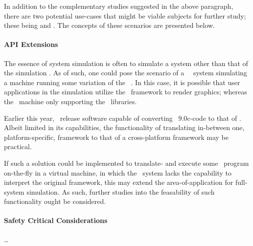\noindent
In addition to the complementary studies suggested in the above paragraph, there are two potential use-cases that might be viable subjects for further study; these being  and .
The concepts of these scenarios are presented below.

\paragraph{API Extensions}
\label{par:futurework_apiextensions}
The essence of system simulation is often to simulate a system other than that of the simulation \dvttermhost .
As of such, one could pose the scenario of a \dvttermlinux\ \dvttermhost\ system simulating a machine running some variation of the \dvttermwindows\ \dvttermos .
In this case, it is possible that user applications in the simulation utilize the \dvttermdirectx\ framework to render graphics; whereas the \dvttermhost\ machine only supporting the \dvttermopengl\ libraries.

Earlier this year, \dvttermvalve\ release software capable of converting \dvttermdirectx\ $9.0$c-code to that of \dvttermopengl {}.
Albeit limited in its capabilities, the functionality of translating in-between one, platform-specific, framework to that of a cross-platform framework may be practical.

If such a solution could be implemented to translate- and execute some \dvttermtarget\ program on-the-fly in a virtual machine, in which the \dvttermhost\ system lacks the capability to interpret the original framework, this may extend the area-of-application for full-system simulation.
As such, further studies into the feasability of such functionality ought be considered.

\paragraph{Safety Critical Considerations}
\label{par:futurework_safetycriticalconsiderations}
\ldots



